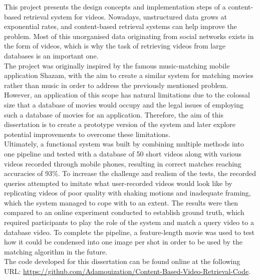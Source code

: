 This project presents the design concepts and implementation steps of a content-based retrieval system for videos. Nowadays, unstructured data grows at exponential rates, and content-based retrieval systems can help improve the problem. Most of this unorganised data originating from social networks exists in the form of videos, which is why the task of retrieving videos from large databases is an important one.\\

The project was originally inspired by the famous music-matching mobile application Shazam, with the aim to create a similar system for matching movies rather than music in order to address the previously mentioned problem. However, an application of this scope has natural limitations due to the colossal size that a database of movies would occupy and the legal issues of employing such a database of movies for an application. Therefore, the aim of this dissertation is to create a prototype version of the system and later explore potential improvements to overcome these limitations.\\

Ultimately, a functional system was built by combining multiple methods into one pipeline and tested with a database of 50 short videos along with various videos recorded through mobile phones, resulting in correct matches reaching accuracies of 93\%. To increase the challenge and realism of the tests, the recorded queries attempted to imitate what user-recorded videos would look like by replicating videos of poor quality with shaking motions and inadequate framing, which the system managed to cope with to an extent. The results were then compared to an online experiment conducted to establish ground truth, which required participants to play the role of the system and match a query video to a database video. To complete the pipeline, a feature-length movie was used to test how it could be condensed into one image per shot in order to be used by the matching algorithm in the future.\\

The code developed for this dissertation can be found online at the following URL: \url{https://github.com/Adamouization/Content-Based-Video-Retrieval-Code}.